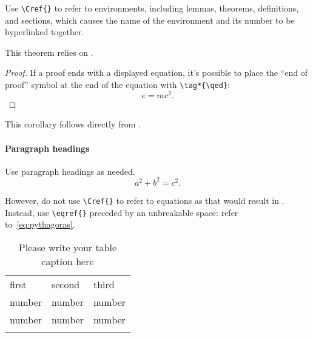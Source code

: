 \documentclass[smallextended]{svjour3}       %
\begin{document}
Use \verb|\Cref{}| to refer to environments, including lemmas, theorems, definitions, and sections, which causes the name of the environment and its number to be hyperlinked together.

\begin{theorem}%
  \label{thm:important}
  This theorem relies on .
\end{theorem}

\begin{proof}
  If a proof ends with a displayed equation, it's possible to place the ``end of proof'' symbol at the end of the equation with \verb|\tag*{\qed}|:
  \[
    e = mc^2.
    \tag*{\qed}
  \]
\end{proof}

\begin{corollary}
  This corollary follows directly from .
\end{corollary}

\paragraph{Paragraph headings}

Use paragraph headings as needed.
\begin{equation}%
  \label{eq:pythagoras}
  a^2+b^2=c^2.
\end{equation}

However, do not use \verb|\Cref{}| to refer to equations as that would result in .
Instead, use \verb|\eqref{}| preceded by an unbreakable space: refer to~\eqref{eq:pythagoras}.

%
\begin{table}[ht]
  \caption{Please write your table caption here}
  \label{tab:1}       %
  \begin{tabular}{lll}
    \hline\noalign{\smallskip}
    first & second & third  \\
    \noalign{\smallskip}\hline\noalign{\smallskip}
    number & number & number \\
    number & number & number \\
    \noalign{\smallskip}\hline
  \end{tabular}
\end{table}

\newpage

\hypertarget{contents}{}  %
\tableofcontents
\listoftodos
\end{document}
